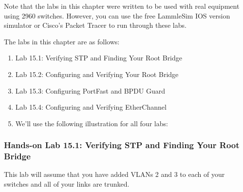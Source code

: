 Note that the labs in this chapter were written to be used with real
equipment using 2960 switches. However, you can use the free LammleSim
IOS version simulator or Cisco's Packet Tracer to run through these
labs.

The labs in this chapter are as follows:

\begin{enumerate}
\tightlist
\item
  Lab 15.1: Verifying STP and Finding Your Root Bridge
\item
  Lab 15.2: Configuring and Verifying Your Root Bridge
\item
  Lab 15.3: Configuring PortFast and BPDU Guard
\item
  Lab 15.4: Configuring and Verifying EtherChannel
\item
  We'll use the following illustration for all four labs:
\end{enumerate}

\begin{figure}
\centering
\caption{}
\end{figure}

\subsubsection[Hands-on Lab 15.1: Verifying STP and Finding Your Root
Bridge]{\texorpdfstring{\protect\hypertarget{c15.xhtmlux5cux23c15-sec-25}{}{}Hands-on
Lab 15.1: Verifying STP and Finding Your Root
Bridge}{Hands-on Lab 15.1: Verifying STP and Finding Your Root Bridge}}

This lab will assume that you have added VLANs 2 and 3 to each of your
switches and all of your links are trunked.

